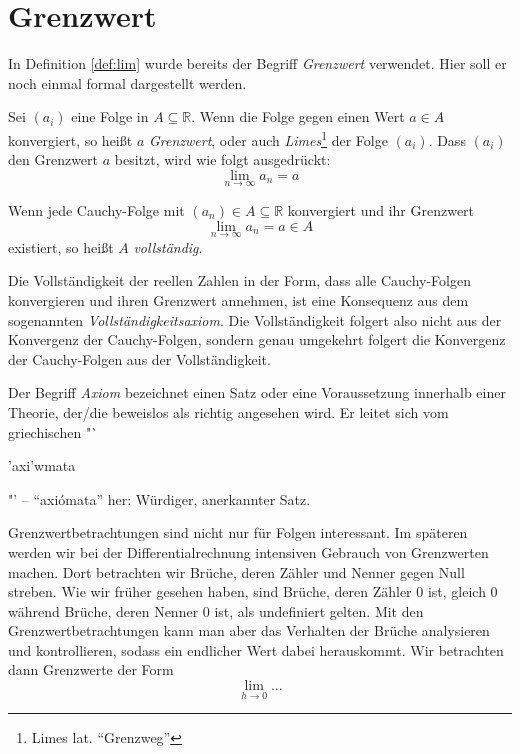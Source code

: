 \section{Grenzwert}

In Definition \ref{def:lim} wurde bereits der Begriff \emph{Grenzwert} verwendet. Hier soll er noch einmal formal dargestellt werden. 

\begin{definition}
Sei $(a_i)$ eine Folge in $A\subseteq \mathbb{R}$. Wenn die Folge gegen einen Wert $a\in A$ konvergiert, so heißt $a$ \emph{Grenzwert}, oder auch \emph{Limes}\footnote{Limes lat. "`Grenzweg"'} der Folge $(a_i)$. Dass $(a_i)$ den Grenzwert $a$ besitzt, wird wie folgt ausgedrückt:
\[
\lim_{n\rightarrow \infty} a_n = a
\]
\end{definition}

\begin{definition}\label{def:voll}
Wenn jede Cauchy-Folge mit $(a_n)\in A\subseteq \mathbb{R}$ konvergiert und ihr Grenzwert 
\[\lim_{n\rightarrow \infty} a_n = a\in A\] 
existiert, so heißt $A$ \emph{vollständig}. 

Die Vollständigkeit der reellen Zahlen in der Form, dass alle Cauchy-Folgen konvergieren und ihren Grenzwert annehmen, ist eine Konsequenz aus dem sogenannten \emph{Vollständigkeitsaxiom}. Die Vollständigkeit folgert also nicht aus der Konvergenz der Cauchy-Folgen, sondern genau umgekehrt folgert die Konvergenz der Cauchy-Folgen aus der Vollständigkeit. 
\end{definition}


Der Begriff \emph{Axiom} bezeichnet einen Satz oder eine Voraussetzung innerhalb einer Theorie, der/die beweislos als richtig angesehen wird. Er leitet sich vom griechischen "`\begin{greek}'axi'wmata\end{greek}"' -- "`axi\'omata"' her: Würdiger, anerkannter Satz.

\bigskip 

Grenzwertbetrachtungen sind nicht nur für Folgen interessant. Im späteren werden wir bei der Differentialrechnung intensiven Gebrauch von Grenzwerten machen. Dort betrachten wir Brüche, deren Zähler und Nenner gegen Null streben. Wie wir früher gesehen haben, sind Brüche, deren Zähler 0 ist, gleich 0 während Brüche, deren Nenner 0 ist, als undefiniert gelten. Mit den Grenzwertbetrachtungen kann man aber das Verhalten der Brüche analysieren und kontrollieren, sodass ein endlicher Wert dabei herauskommt. Wir betrachten dann Grenzwerte der Form
\begin{equation}
\lim\limits_{h \rightarrow 0} \dots
\end{equation}

